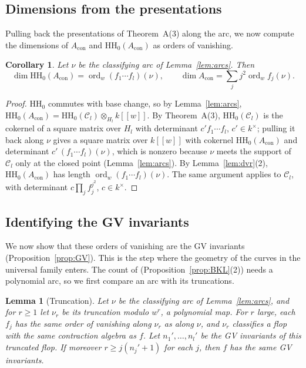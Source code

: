 \documentclass[11pt]{amsart}
\numberwithin{table}{section}
\numberwithin{figure}{section}
\numberwithin{equation}{section}
\newtheorem{lem}[thm]{Lemma}
\newtheorem{cor}[thm]{Corollary}
\theoremstyle{definition}
\theoremstyle{plain}
\newcommand{\Acon}{A_{\mathrm{con}}}
\newcommand{\cC}{\mathcal{C}}
\newcommand{\HH}{\mathrm{HH}}
\DeclareMathOperator{\ord}{ord}
\begin{document}
\subsection{\texorpdfstring{Dimensions from the presentations}{Dimensions from the presentations}}\label{ss:dims}

Pulling back the presentations of Theorem~A(3) along the arc, we now compute the dimensions of $\Acon$ and $\HH_0(\Acon)$ as orders of vanishing.

\begin{cor}\label{cor:rootsum}
Let $\nu$ be the classifying arc of Lemma~\ref{lem:arcs}. Then
\[
\dim \HH_0(\Acon) = \ord_w (f_1 \cdots f_l)(\nu), \qquad \dim \Acon = \sum_{j} j^2 \ord_w f_j(\nu).
\]
\end{cor}

\begin{proof}
$\HH_0$ commutes with base change, so by Lemma~\ref{lem:arcs}, $\HH_0(\Acon) = \HH_0(\cC_l) \otimes_{H_l} k[[w]]$. By Theorem~A(3), $\HH_0(\cC_l)$ is the cokernel of a square matrix over $H_l$ with determinant $c'f_1 \cdots f_l$, $c' \in k^\times$; pulling it back along $\nu$ gives a square matrix over $k[[w]]$ with cokernel $\HH_0(\Acon)$ and determinant $c'\,(f_1 \cdots f_l)(\nu)$, which is nonzero because $\nu$ meets the support of $\cC_l$ only at the closed point (Lemma~\ref{lem:arcs}). By Lemma~\ref{lem:dvr}(2), $\HH_0(\Acon)$ has length $\ord_w (f_1 \cdots f_l)(\nu)$. The same argument applies to $\cC_l$, with determinant $c \prod_j f_j^{j^2}$, $c \in k^\times$.
\end{proof}

\subsection{Identifying the GV invariants}\label{ss:GV}

We now show that these orders of vanishing are the GV invariants (Proposition~\ref{prop:GV}). This is the step where the geometry of the curves in the universal family enters. The count of \cite{BKL} (Proposition~\ref{prop:BKL}(2)) needs a polynomial arc, so we first compare an arc with its truncations.

\begin{lem}[Truncation]\label{lem:truncation}
Let $\nu$ be the classifying arc of Lemma~\ref{lem:arcs}, and for $r \ge 1$ let $\nu_r$ be its truncation modulo $w^r$, a polynomial map. For $r$ large, each $f_j$ has the same order of vanishing along $\nu_r$ as along $\nu$, and $\nu_r$ classifies a flop with the same contraction algebra as $f$. Let $n_1', \dots, n_l'$ be the GV invariants of this truncated flop. If moreover $r \ge j(n_j' + 1)$ for each $j$, then $f$ has the same GV invariants.
\end{lem}
\end{document}

